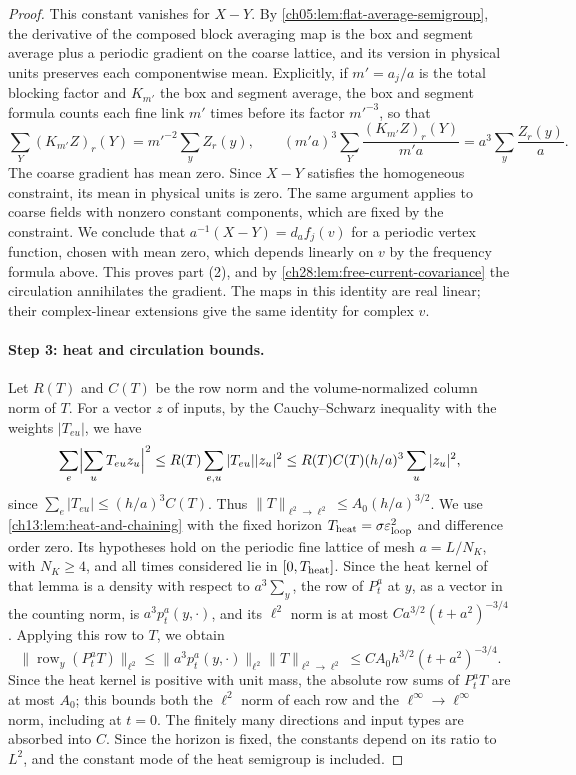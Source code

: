 \begin{proof}
This constant vanishes for $X-Y$. By \cref{ch05:lem:flat-average-semigroup}, the derivative of the composed block averaging map is the box and segment average plus a periodic gradient on the coarse lattice, and its version in physical units preserves each componentwise mean. Explicitly, if $m'=a_j/a$ is the total blocking factor and $K_{m'}$ the box and segment average, the box and segment formula counts each fine link $m'$ times before its factor $m'^{-3}$, so that
\[
 \sum_Y(K_{m'}Z)_r(Y)=m'^{-2}\sum_yZ_r(y),\qquad (m'a)^3\sum_Y\frac{(K_{m'}Z)_r(Y)}{m'a}=a^3\sum_y\frac{Z_r(y)}a.
\]
The coarse gradient has mean zero. Since $X-Y$ satisfies the homogeneous constraint, its mean in physical units is zero. The same argument applies to coarse fields with nonzero constant components, which are fixed by the constraint. We conclude that $a^{-1}(X-Y)=d_af_j(v)$ for a periodic vertex function, chosen with mean zero, which depends linearly on $v$ by the frequency formula above. This proves part (2), and by \cref{ch28:lem:free-current-covariance} the circulation annihilates the gradient. The maps in this identity are real linear; their complex-linear extensions give the same identity for complex $v$.

\paragraph{Step 3: heat and circulation bounds.}
Let $R(T)$ and $C(T)$ be the row norm and the volume-normalized column norm of $T$. For a vector $z$ of inputs, by the Cauchy--Schwarz inequality with the weights $|T_{eu}|$, we have
\[
 \sum_e\Bigl|\sum_uT_{eu}z_u\Bigr|^2\le R(T)\sum_{e,u}|T_{eu}||z_u|^2\le R(T)C(T)(h/a)^3\sum_u|z_u|^2,
\]
since $\sum_e|T_{eu}|\le(h/a)^3C(T)$. Thus $\|T\|_{\ell^2\to\ell^2}\le A_0(h/a)^{3/2}$. We use \cref{ch13:lem:heat-and-chaining} with the fixed horizon $T_{\rm heat}=\sigma\varepsilon_{\rm loop}^2$ and difference order zero. Its hypotheses hold on the periodic fine lattice of mesh $a=L/N_K$, with $N_K\ge4$, and all times considered lie in $[0,T_{\rm heat}]$. Since the heat kernel of that lemma is a density with respect to $a^3\sum_y$, the row of $P^a_t$ at $y$, as a vector in the counting norm, is $a^3p^a_t(y,\cdot)$, and its $\ell^2$ norm is at most $Ca^{3/2}(t+a^2)^{-3/4}$. Applying this row to $T$, we obtain
\[
 \|\operatorname{row}_y(P^a_tT)\|_{\ell^2}\le\|a^3p^a_t(y,\cdot)\|_{\ell^2}\|T\|_{\ell^2\to\ell^2}\le CA_0h^{3/2}(t+a^2)^{-3/4}.
\]
Since the heat kernel is positive with unit mass, the absolute row sums of $P^a_tT$ are at most $A_0$; this bounds both the $\ell^2$ norm of each row and the $\ell^\infty\to\ell^\infty$ norm, including at $t=0$. The finitely many directions and input types are absorbed into $C$. Since the horizon is fixed, the constants depend on its ratio to $L^2$, and the constant mode of the heat semigroup is included.


\end{proof}
